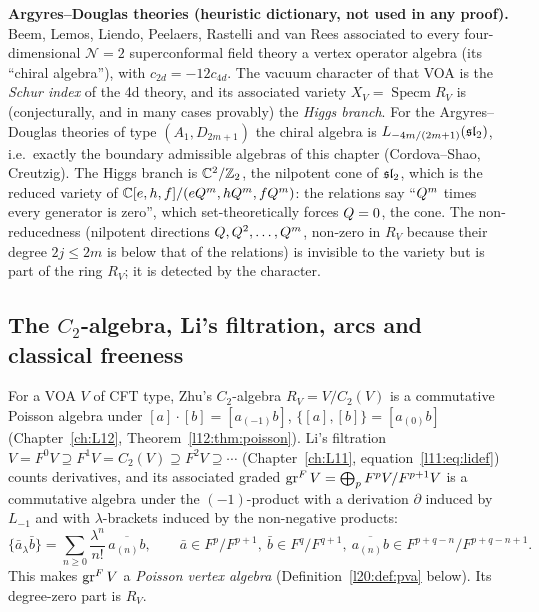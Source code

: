 \begin{physics}
\textbf{Argyres--Douglas theories (heuristic dictionary, not used in any proof).} Beem, Lemos, Liendo,
Peelaers, Rastelli and van Rees associated to every four-dimensional $\mathcal N=2$ superconformal field
theory a vertex operator algebra (its ``chiral algebra''), with $c_{2d}=-12c_{4d}$. The vacuum character of
that VOA is the \emph{Schur index} of the 4d theory, and its associated variety
$X_V=\operatorname{Specm}R_V$ is (conjecturally, and in many cases provably) the \emph{Higgs branch}.
For the Argyres--Douglas theories of type $(A_1,D_{2m+1})$ the chiral algebra is
$L_{-4m/(2m+1)}(\mathfrak{sl}_2)$, i.e.\ exactly the boundary admissible algebras of this chapter (Cordova--Shao,
Creutzig). The Higgs branch is ${\mathbb{C}}^2/{\mathbb{Z}}_2$, the nilpotent cone of $\mathfrak{sl}_2$, which is the reduced variety
of ${\mathbb{C}}[e,h,f]/(eQ^m,hQ^m,fQ^m)$: the relations say ``$Q^m$ times every
generator is zero'', which set-theoretically forces $Q=0$, the cone. The non-reducedness (nilpotent
directions $Q,Q^2,\dots,Q^{m}$, non-zero in $R_V$ because their degree $2j\le2m$ is below that of the relations) is invisible to the variety but
is part of the ring $R_V$; it is detected by the character.
\end{physics}

\subsection{The $C_2$-algebra, Li's filtration, arcs and classical freeness}

For a VOA $V$ of CFT type, Zhu's $C_2$-algebra $R_V=V/C_2(V)$ is a commutative Poisson algebra under
$[a]\cdot[b]=[a_{(-1)}b]$, $\{[a],[b]\}=[a_{(0)}b]$ (Chapter~\ref{ch:L12}, Theorem~\ref{l12:thm:poisson}).
Li's filtration $V=F^0V\supseteq F^1V=C_2(V)\supseteq F^2V\supseteq\cdots$ (Chapter~\ref{ch:L11},
equation~\eqref{l11:eq:lidef}) counts derivatives, and its associated graded
$\operatorname{gr}^F V=\bigoplus_pF^pV/F^{p+1}V$ is a commutative algebra under the $(-1)$-product with a derivation
$\partial$ induced by $L_{-1}$ and with $\lambda$-brackets induced by the non-negative products:
\begin{equation}\label{l20:eq:grbracket}
\{\bar a_\lambda\bar b\}=\sum_{n\ge0}\frac{\lambda^n}{n!}\,\overline{a_{(n)}b},\qquad
\bar a\in F^p/F^{p+1},\ \bar b\in F^q/F^{q+1},\ \overline{a_{(n)}b}\in F^{p+q-n}/F^{p+q-n+1}.
\end{equation}
This makes $\operatorname{gr}^F V$ a \emph{Poisson vertex algebra} (Definition~\ref{l20:def:pva} below). Its degree-zero
part is $R_V$.

